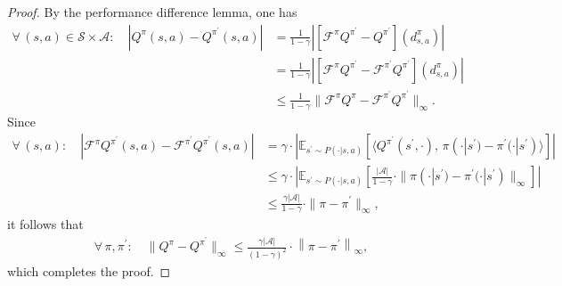 \documentclass[10pt,a4paper]{amsart}
\newcommand{\E}{\mathbb{E}}
\newcommand{\calA}{\mathcal{A}}
\newcommand{\calF}{\mathcal{F}}
\newcommand{\calS}{\mathcal{S}}
\newcommand{\ls}{\left}
\newcommand{\rs}{\right}
\begin{document}
\begin{proof}
    By the performance difference lemma, one has
    \begin{align*}
    \forall\, (s,a) \in \calS \times \calA: \quad | Q^{\pi}(s,a) - Q^{\pi^\prime}(s,a) | &= \frac{1}{1-\gamma} | [\calF^{\pi}Q^{\pi^\prime} - Q^{\pi^\prime}](d^{\pi}_{s,a}) | \\
    &= \frac{1}{1-\gamma} | [\calF^{\pi}Q^{\pi^\prime} - \calF^{\pi^\prime}Q^{\pi^\prime}](d^{\pi}_{s,a}) | \\
    &\leq \frac{1}{1-\gamma} \| \calF^{\pi} Q^{\pi} - \calF^{\pi^\prime} Q^{\pi^\prime} \|_\infty.
    \end{align*}
    Since
    \begin{align*}
        \forall\, (s,a) : \quad | \calF^{\pi} Q^{\pi^\prime}(s,a) - \calF^{\pi^\prime} Q^{\pi^\prime}(s,a) | &= \gamma \cdot | \E_{s^\prime \sim P(\cdot|s,a)} [ \langle Q^{\pi^\prime} (s^\prime, \cdot), \, \pi(\cdot|s^\prime) - \pi^\prime(\cdot|s^\prime) \rangle ] | \\
        &\leq \gamma \cdot | \E_{s^\prime \sim P(\cdot|s,a)} [ \frac{|\calA|}{1-\gamma} \cdot \| \pi(\cdot|s^\prime) - \pi^\prime(\cdot|s^\prime) \|_\infty ] | \\
        &\leq \frac{\gamma |\calA|}{1-\gamma} \cdot \| \pi - \pi^\prime \|_\infty,
    \end{align*}
   it follows that
    \begin{align*}
        \forall\, \pi, \pi^\prime: \quad \| Q^\pi - Q^{\pi^\prime} \|_\infty \leq \frac{\gamma |\calA|}{(1-\gamma)^2} \cdot \ls\| \pi - \pi^\prime \rs\|_\infty,
    \end{align*}
    which completes the proof.
\end{proof}
\end{document}
